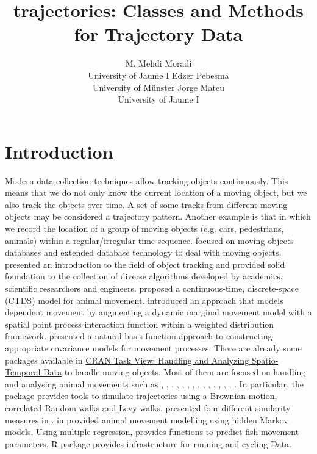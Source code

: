\documentclass[article]{jss}
\author{M. Mehdi Moradi\\University of Jaume I
    \And Edzer Pebesma\\University of M\"unster
    \And Jorge Mateu\\University of Jaume I}
\title{trajectories: Classes and Methods for Trajectory Data}
\begin{document}
\section[Introduction]{Introduction}\label{sec:intro}
Modern data collection techniques allow tracking objects continuously. This means that we do not only know the current location of a moving object, but we also track the objects over time. A set of some tracks from different moving objects may be considered a trajectory pattern. Another example is that in which we record the location of a group of moving objects (e.g. cars, pedestrians, animals) within a regular/irregular time sequence. \cite{guting05} focused on moving objects databases and extended database technology to deal with moving objects. \cite{challa2011} presented an introduction to the field of object tracking and provided solid foundation to the collection of diverse algorithms developed by academics, scientific researchers and engineers. \cite{hanks15} proposed a continuous-time, discrete-space (CTDS) model for animal movement. \cite{russell16} introduced an approach that models dependent movement by augmenting a dynamic marginal movement model with a spatial point process interaction function within a weighted distribution framework. \cite{hooten17} presented a natural basis function approach to constructing appropriate covariance models for movement processes. There are already some  packages available in \href{https://cran.r-project.org}{CRAN Task View: Handling and Analyzing Spatio-Temporal Data} to handle moving objects. Most of them are focused on handling and analysing animal movements such as  \citep{calenge06},  \citep{sumner2009},  \citep{argosf},  \citep{V-Track},  \citep{animalTrack},  \citep{BBMM},  \citep{bcpa},  \citep{BayesianAnimalTracker},  \citep{TrackReconstruction},  \citep{mkde},  \citep{SimilarityMeasures},  \citep{smam}, \citep{trip},  \citep{moveHMM},  \citep{FLightR}. In particular, the package  \citep{calenge06} provides tools to simulate trajectories using a Brownian motion, correlated Random walks and Levy walks. \cite{SimilarityMeasures} presented four different similarity measures in . \cite{moveHMM} in  provided animal movement modelling using hidden Markov models. Using multiple regression,  \citep{fishmove}  provides functions to predict fish movement parameters. R package  \citep{frick} provides infrastructure for running and cycling Data.
\end{document}
